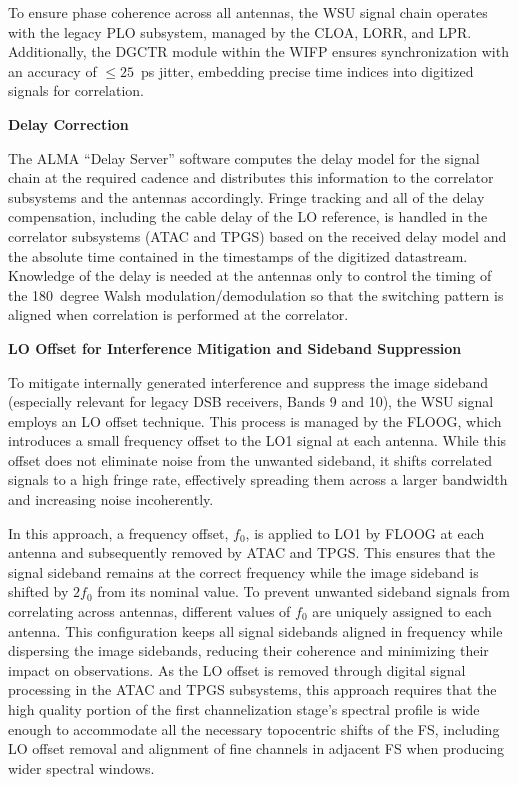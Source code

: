 To ensure phase coherence across all antennas, the \ac{WSU} signal chain operates with the legacy \ac{PLO} subsystem, managed by the \ac{CLOA}, \ac{LORR}, and \ac{LPR}.
Additionally, the \ac{DGCTR} module within the \ac{WIFP} ensures synchronization with an accuracy of $\le 25$~ps jitter, embedding precise time indices into digitized signals for correlation.

\noindent
\textbf{Delay Correction}

The \ac{ALMA} “Delay Server” software computes the delay model for the signal chain at the required cadence and distributes this information to the correlator subsystems and the antennas accordingly.
Fringe tracking and all of the delay compensation, including the cable delay of the \ac{LO} reference, is handled in the correlator subsystems (\ac{ATAC} and \ac{TPGS}) based on the received delay model and the absolute time contained in the timestamps of the digitized datastream.
Knowledge of the delay is needed at the antennas only to control the timing of the 180~degree Walsh modulation/demodulation so that the switching pattern is aligned when correlation is performed at the correlator.


\noindent
\textbf{LO Offset for Interference Mitigation and Sideband Suppression}

To mitigate internally generated interference and suppress the image sideband (especially relevant for legacy \ac{DSB} receivers, Bands 9 and 10), the \ac{WSU} signal employs an \ac{LO} offset technique.
This process is managed by the \ac{FLOOG}, which introduces a small frequency offset to the \ac{LO1} signal at each antenna.
While this offset does not eliminate noise from the unwanted sideband, it shifts correlated signals to a high fringe rate, effectively spreading them across a larger bandwidth and increasing noise incoherently.

In this approach, a frequency offset, $f_0$, is applied to \ac{LO1} by \ac{FLOOG} at each antenna and subsequently removed by \ac{ATAC} and \ac{TPGS}.
This ensures that the signal sideband remains at the correct frequency while the image sideband is shifted by $2f_0$ from its nominal value.
To prevent unwanted sideband signals from correlating across antennas, different values of $f_0$ are uniquely assigned to each antenna.
This configuration keeps all signal sidebands aligned in frequency while dispersing the image sidebands, reducing their coherence and minimizing their impact on observations.
As the \ac{LO} offset is removed through digital signal processing in the \ac{ATAC} and \ac{TPGS} subsystems, this approach requires that the high quality portion of the first channelization stage’s spectral profile is wide enough to accommodate all the necessary topocentric shifts of the \ac{FS}, including \ac{LO} offset removal and alignment of fine channels in adjacent \ac{FS} when producing wider spectral windows.

